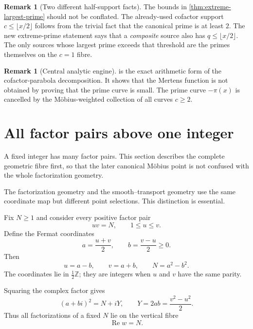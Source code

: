 \documentclass[11pt]{article}
\theoremstyle{definition}
\newtheorem{remark}[theorem]{Remark}
\newcommand{\1}{\mathbf{1}}
\newcommand{\Z}{\mathbb{Z}}
\newcommand{\Repart}{\operatorname{Re}}
\begin{document}
\begin{remark}[Two different half-support facts]
The bounds in \cref{thm:extreme-largest-prime} should not be conflated.  The already-used cofactor support $c\le\lfloor x/2\rfloor$ follows from the trivial fact that the canonical prime is at least $2$.  The new extreme-prime statement says that a \emph{composite} source also has $q\le\lfloor x/2\rfloor$.  The only sources whose largest prime exceeds that threshold are the primes themselves on the $c=1$ fibre.
\end{remark}

\begin{remark}[Central analytic engine]
 is the exact arithmetic form of the
cofactor-parabola decomposition.  It shows that the Mertens function is
not obtained by proving that the prime curve is small.  The prime curve
$-\pi(x)$ is cancelled by the M\"obius-weighted collection of all
curves $c\ge2$.
\end{remark}

\section{All factor pairs above one integer}
\label{sec:full-fibre}

A fixed integer has many factor pairs.  This section describes the complete geometric fibre first, so that the later canonical M\"obius point is not confused with the whole factorization geometry.

The factorization geometry and the smooth--transport geometry use the same coordinate map but different point selections.  This distinction is essential.

Fix $N\ge1$ and consider every positive factor pair
\begin{equation}
 uv=N,
 \qquad
 1\le u\le v.
 \label{eq:factor-pair}
\end{equation}
Define the Fermat coordinates
\begin{equation}
 a=\frac{u+v}{2},
 \qquad
 b=\frac{v-u}{2}\ge0.
 \label{eq:full-Fermat}
\end{equation}
Then
\begin{equation}
 u=a-b,
 \qquad
 v=a+b,
 \qquad
 N=a^2-b^2.
 \label{eq:full-recovery}
\end{equation}
The coordinates lie in $\frac12\Z$; they are integers when $u$ and $v$ have the same parity.

Squaring the complex factor gives
\begin{equation}
 (a+bi)^2=N+iY,
 \qquad
 \boxed{Y=2ab=\frac{v^2-u^2}{2}.}
 \label{eq:full-square}
\end{equation}
Thus all factorizations of a fixed $N$ lie on the vertical fibre
\begin{equation}
 \Repart w=N.
 \label{eq:vertical-fibre}
\end{equation}
\end{document}
